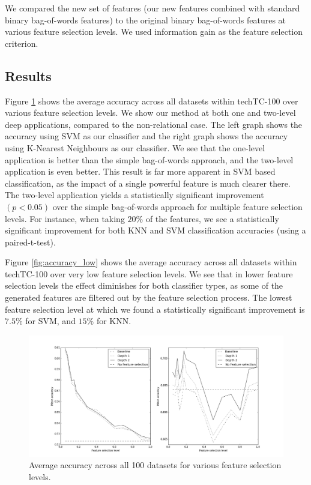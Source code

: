 \documentclass{article}
\theoremstyle{definition}
\begin{document}
We compared the new set of features (our new features combined with standard binary bag-of-words features) to the original binary bag-of-words features at various feature selection levels. We used information gain as the feature selection criterion.
\subsection{Results}
Figure \ref{fig:accuracy} shows the average accuracy across all datasets within techTC-100 over various feature selection levels. We show our method at both one and two-level deep applications, compared to the non-relational case. The left graph shows the accuracy using SVM \citep{cortes1995support} as our classifier and the right graph shows the accuracy using K-Nearest Neighbours \citep{fix1951discriminatory} as our classifier. %
We see that the one-level application is better than the simple bag-of-words approach, and the two-level application is even better. This result is far more apparent in SVM based classification, as the impact of a single powerful feature is much clearer there. The two-level application yields a statistically significant improvement $ (p<0.05) $ over the simple bag-of-words approach for multiple feature selection levels. For instance, when taking $20\% $ of the features, we see a statistically significant improvement for both KNN and SVM classification accuracies (using a paired-t-test). 

Figure \ref{fig:accuracy_low} shows the average accuracy across all datasets within techTC-100 over very low feature selection levels. 
We see that in lower feature selection levels the effect diminishes for both classifier types, as some of the generated features are filtered out by the feature selection process. The lowest feature selection level at which we found a statistically significant improvement is $7.5\%$ for SVM, and $15\%$ for KNN.

\begin{figure}[h!]
	\centering
	\includegraphics[scale=0.4, keepaspectratio=true]{accuracy.png}
	\caption{Average accuracy across all 100 datasets for various feature selection levels.}
	\label{fig:accuracy}
\end{figure}
\end{document}
